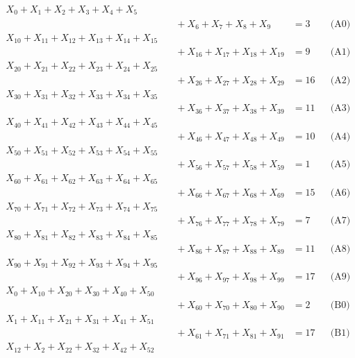 \documentclass[a4paper,10pt]{article}
\begin{document}
\allowdisplaybreaks
{\small\begin{align}
X_{0} + X_{1} + X_{2} + X_{3} + X_{4} + X_{5} \\[0.5ex]
&\quad  + X_{6} + X_{7} + X_{8} + X_{9} &= 3 && \text{(A0)} \\
X_{10} + X_{11} + X_{12} + X_{13} + X_{14} + X_{15} \\[0.5ex]
&\quad  + X_{16} + X_{17} + X_{18} + X_{19} &= 9 && \text{(A1)} \\
X_{20} + X_{21} + X_{22} + X_{23} + X_{24} + X_{25} \\[0.5ex]
&\quad  + X_{26} + X_{27} + X_{28} + X_{29} &= 16 && \text{(A2)} \\
X_{30} + X_{31} + X_{32} + X_{33} + X_{34} + X_{35} \\[0.5ex]
&\quad  + X_{36} + X_{37} + X_{38} + X_{39} &= 11 && \text{(A3)} \\
X_{40} + X_{41} + X_{42} + X_{43} + X_{44} + X_{45} \\[0.5ex]
&\quad  + X_{46} + X_{47} + X_{48} + X_{49} &= 10 && \text{(A4)} \\
X_{50} + X_{51} + X_{52} + X_{53} + X_{54} + X_{55} \\[0.5ex]
&\quad  + X_{56} + X_{57} + X_{58} + X_{59} &= 1 && \text{(A5)} \\
X_{60} + X_{61} + X_{62} + X_{63} + X_{64} + X_{65} \\[0.5ex]
&\quad  + X_{66} + X_{67} + X_{68} + X_{69} &= 15 && \text{(A6)} \\
X_{70} + X_{71} + X_{72} + X_{73} + X_{74} + X_{75} \\[0.5ex]
&\quad  + X_{76} + X_{77} + X_{78} + X_{79} &= 7 && \text{(A7)} \\
X_{80} + X_{81} + X_{82} + X_{83} + X_{84} + X_{85} \\[0.5ex]
&\quad  + X_{86} + X_{87} + X_{88} + X_{89} &= 11 && \text{(A8)} \\
X_{90} + X_{91} + X_{92} + X_{93} + X_{94} + X_{95} \\[0.5ex]
&\quad  + X_{96} + X_{97} + X_{98} + X_{99} &= 17 && \text{(A9)} \\
X_{0} + X_{10} + X_{20} + X_{30} + X_{40} + X_{50} \\[0.5ex]
&\quad  + X_{60} + X_{70} + X_{80} + X_{90} &= 2 && \text{(B0)} \\
X_{1} + X_{11} + X_{21} + X_{31} + X_{41} + X_{51} \\[0.5ex]
&\quad  + X_{61} + X_{71} + X_{81} + X_{91} &= 17 && \text{(B1)} \\
X_{12} + X_{2} + X_{22} + X_{32} + X_{42} + X_{52} \\[0.5ex]

\end{align}}
\end{document}
